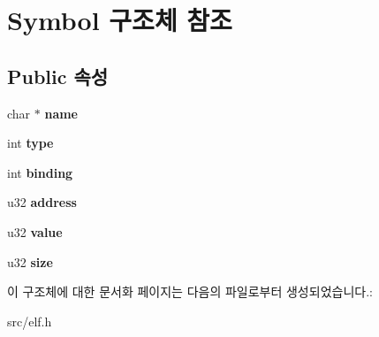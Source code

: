 \hypertarget{struct_symbol}{}\section{Symbol 구조체 참조}
\label{struct_symbol}
\subsection*{Public 속성}
\begin{DoxyCompactItemize}
\item 
\mbox{\label{struct_symbol_aa9ba617cd9de17ed73148893a6c14606}} 
char $\ast$ {\bfseries name}
\item 
\mbox{\label{struct_symbol_a3a8a7698da2e96f2fd77296b5191ce6f}} 
int {\bfseries type}
\item 
\mbox{\label{struct_symbol_a7b846956436c2911e3b316bf06b080fd}} 
int {\bfseries binding}
\item 
\mbox{\label{struct_symbol_a410b524fa23be6c41b1de68c9b620226}} 
u32 {\bfseries address}
\item 
\mbox{\label{struct_symbol_aefbe563b4964a3cc4ee85c3efaccb7d2}} 
u32 {\bfseries value}
\item 
\mbox{\label{struct_symbol_a1ce0cce2939edefe73195657c6371f56}} 
u32 {\bfseries size}
\end{DoxyCompactItemize}


이 구조체에 대한 문서화 페이지는 다음의 파일로부터 생성되었습니다.\+:\begin{DoxyCompactItemize}
\item 
src/elf.\+h\end{DoxyCompactItemize}
